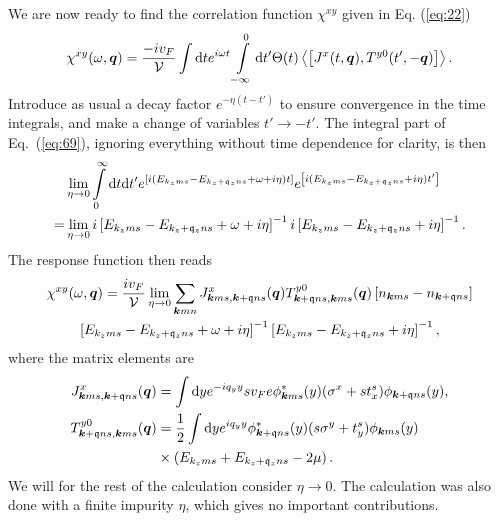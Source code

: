 We are now ready to find the correlation function $\chi ^{xy}$ given in Eq. (\ref{eq:22})
\begin{equation}
  \label{eq:69}
  \chi ^{xy}(\omega, \vec{q}) =
  \frac{-i v_F}{\mathcal{V}  }
  \int \mathrm{d}t e^{i \omega t} \int\limits_{-\infty }^0 \mathrm{d}t'
  \Theta (t)
  \Braket{\left[
J^x(t, \vec{q}), T^{y 0}(t', -\vec{q})
    \right]}.
\end{equation}
Introduce as usual a decay factor $e^{-\eta (t-t')}$ to ensure convergence in the time integrals, and make a change of variables $t' \to -t'	$.
The integral part of Eq.~(\ref{eq:69}), ignoring everything without time dependence for clarity, is then
\begin{align}
  &\lim_{\eta \to 0}
  \int\limits_{0}^{\infty } \mathrm{d}t \mathrm{d}t'
    e^{\left[ i \left(
        E_{k_z m s} - E_{k_z+\mathfrak{q}_z ns} + \omega   + i \eta
      \right) t \right]}
    e^{\left[ i \left(
        E_{k_z m s} - E_{k_z+\mathfrak{q}_z ns} + i \eta
      \right) t' \right]} \nonumber \\
  =
  &\lim_{\eta \to 0} i \left[ E_{k_zms} - E_{k_z+\mathfrak{q}_z ns} + \omega   + i\eta   \right]^{-1}
i \left[ E_{k_zms} - E_{k_z+\mathfrak{q}_z ns} + i \eta   \right]^{-1}.
\end{align}
The response function then reads
\begin{multline}
  \chi ^{xy}(\omega , \bm{q}) =
  \frac{i v_F  }{\mathcal{V} }
  \lim_{\eta \to 0}
  \sum\limits_{\bm{k}mn}^{}
  J^x_{\bm{k}ms, \bm{k}+\mathfrak{q}ns}(\bm{q})
  T^{y 0}_{\bm{k}+\mathfrak{q}ns, \bm{k}ms}(\bm{q})
  \left[ n_{\bm{k}ms}- n_{\bm{k}+\mathfrak{q} ns} \right] \\
  \left[ E_{k_zms} - E_{k_z+\mathfrak{q}_z ns} + \omega   + i\eta   \right]^{-1}
  \left[ E_{k_zms} - E_{k_z+\mathfrak{q}_z ns} + i \eta   \right]^{-1},
\end{multline}
where the matrix elements are
\begin{align}\label{eq:70}
  J^x_{\bm{k}ms, \bm{k}+\mathfrak{q}ns}(\bm{q}) &= \int \mathrm{d}y
                                                e^{-i q_y y}
                                                 s v_F e\phi ^{*}_{\bm{k}m s}(y)
                                                 (\sigma^x + s t^s_x)
                                                \phi _{\bm{k}+\mathfrak{q}n s}(y),\\
\label{eq:9} T^{y 0}_{\bm{k}+\mathfrak{q} n s, \bm{k} m s}(\bm{q}) &= \frac{1}{2}
              \int \mathrm{d}y
              e^{iq_y y}
              \phi ^{*}_{\bm{k}+\mathfrak{q} n s}(y)
              (s\sigma^y + t^s_y )
              \phi _{\bm{k} m s}(y)\\
\nonumber              & \times \left(
              E_{k_zm s} + E_{k_z+\mathfrak{q}_z n s} - 2 \mu
              \right).
\end{align}
We will for the rest of the calculation consider \( \eta \to 0 \).
The calculation was also done with a finite impurity \( \eta \), which gives no important contributions.

